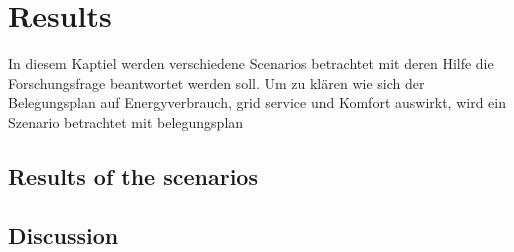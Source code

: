 \chapter{Results}
\label{ch:results}
In diesem Kaptiel werden verschiedene Scenarios betrachtet mit deren Hilfe die Forschungsfrage beantwortet werden soll. Um zu klären wie sich der Belegungsplan auf Energyverbrauch, grid service und Komfort auswirkt, wird ein Szenario betrachtet mit belegungsplan 
\section{Results of the scenarios}
\label{sec:ResultsScenarios}







\section{Discussion}
\label{sec:discussion}

%
